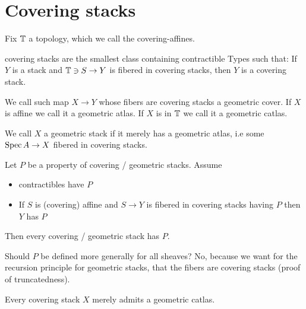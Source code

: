 
\section{Covering stacks}
Fix $\mathbb{T}$ a topology, which we call the covering-affines.
\begin{definition}
	covering stacks are the smallest class containing contractible Types such that: If $Y$ is a stack and $\mathbb{T} \ni S \to Y$ is fibered in covering stacks, then $Y$ is a covering stack.	
\end{definition}
We call such map $X \to Y$ whose fibers are covering stacks a geometric cover. If $X$ is affine we call it a geometric atlas. If $X$ is in $\mathbb{T}$ we call it a geometric catlas. 
\begin{definition}
	We call $X$ a geometric stack if it merely has a geometric atlas, i.e some $\operatorname{Spec} A \to X$ fibered in covering stacks.
\end{definition}
\begin{prop}
	Let $P$ be a property of covering / geometric stacks. Assume
	\begin{itemize}
		\item contractibles have $P$
		\item If $S$ is (covering) affine and $S \to Y$ is fibered in covering stacks having $P$ then $Y$ has $P$
	\end{itemize}
	Then every covering / geometric stack has $P$.
\end{prop}
%	
\begin{why}
	Should $P$ be defined more generally for all sheaves?
	No, because we want for the recursion principle for geometric stacks, that the fibers are covering stacks (proof of truncatedness).
\end{why}
\begin{prop}{\label{prop:csHasAtlas}}
Every covering stack $X$ merely admits a geometric catlas. %
\end{prop}

